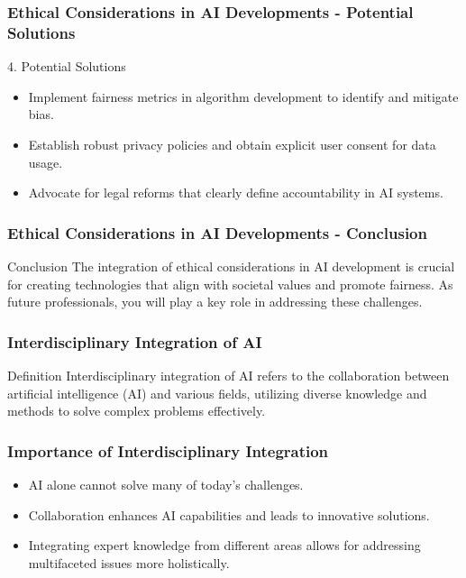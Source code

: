 \documentclass[aspectratio=169]{beamer}
\begin{document}
\begin{frame}[fragile]
    \frametitle{Ethical Considerations in AI Developments - Potential Solutions}
    
    \begin{block}{4. Potential Solutions}
        \begin{itemize}
            \item Implement fairness metrics in algorithm development to identify and mitigate bias.
            \item Establish robust privacy policies and obtain explicit user consent for data usage.
            \item Advocate for legal reforms that clearly define accountability in AI systems.
        \end{itemize}
    \end{block}
\end{frame}

\begin{frame}[fragile]
    \frametitle{Ethical Considerations in AI Developments - Conclusion}
    
    \begin{block}{Conclusion}
        The integration of ethical considerations in AI development is crucial for creating technologies that align with societal values and promote fairness. 
        As future professionals, you will play a key role in addressing these challenges.
    \end{block}
\end{frame}

\begin{frame}[fragile]
    \frametitle{Interdisciplinary Integration of AI}
    \begin{block}{Definition}
        Interdisciplinary integration of AI refers to the collaboration between artificial intelligence (AI) and various fields, utilizing diverse knowledge and methods to solve complex problems effectively.
    \end{block}
\end{frame}

\begin{frame}[fragile]
    \frametitle{Importance of Interdisciplinary Integration}
    \begin{itemize}
        \item AI alone cannot solve many of today’s challenges.
        \item Collaboration enhances AI capabilities and leads to innovative solutions.
        \item Integrating expert knowledge from different areas allows for addressing multifaceted issues more holistically.
    \end{itemize}
\end{frame}
\end{document}

